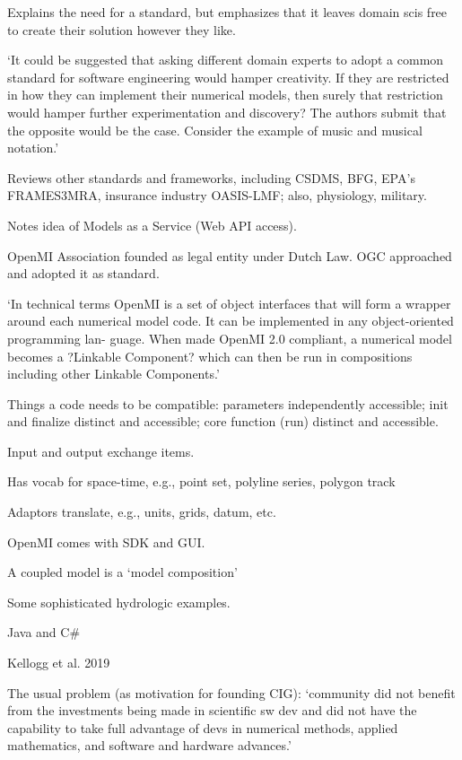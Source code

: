 \documentclass[12pt]{amsart}
\begin{document}
Explains the need for a standard, but emphasizes that it leaves domain scis free to create their solution however they like.

`It could be suggested that asking different domain experts to adopt a common standard for software engineering would hamper creativity. If they are restricted in how they can implement their numerical models, then surely that restriction would hamper further experimentation and discovery? The authors submit that the opposite would be the case. Consider the example of music and musical notation.'

Reviews other standards and frameworks, including CSDMS, BFG, EPA's FRAMES3MRA, insurance industry OASIS-LMF; also, physiology, military.

Notes idea of Models as a Service (Web API access). 

OpenMI Association founded as legal entity under Dutch Law. OGC approached and adopted it as standard.

`In technical terms OpenMI is a set of object interfaces that will form a wrapper around each numerical model code. It can be implemented in any object-oriented programming lan- guage. When made OpenMI 2.0 compliant, a numerical model becomes a ?Linkable Component? which can then be run in compositions including other Linkable Components.'

Things a code needs to be compatible: parameters independently accessible; init and finalize distinct and accessible; core function (run) distinct and accessible.

Input and output exchange items.

Has vocab for space-time, e.g., point set, polyline series, polygon track

Adaptors translate, e.g., units, grids, datum, etc.

OpenMI comes with SDK and GUI.

A coupled model is a `model composition'

Some sophisticated hydrologic examples.

Java and C\#



Kellogg et al. 2019

The usual problem (as motivation for founding CIG): `community did not benefit from the investments being made in scientific sw dev and did not have the capability to take full advantage of devs in numerical methods, applied mathematics, and software and hardware advances.'
\end{document}
